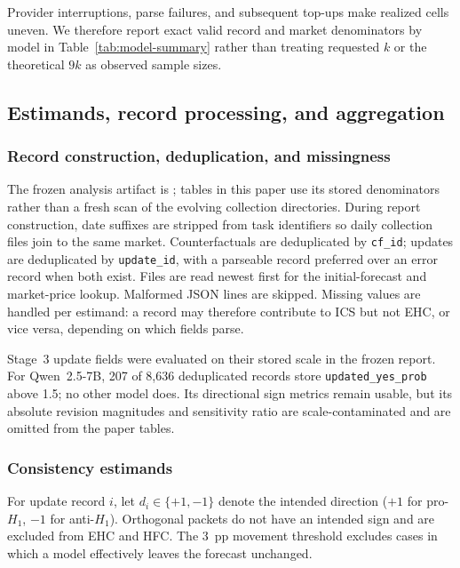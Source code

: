 Provider interruptions, parse failures, and subsequent top-ups make realized cells
uneven.  We therefore report exact valid record and market denominators by model in
Table~\ref{tab:model-summary} rather than treating requested \(k\) or the theoretical
\(9k\) as observed sample sizes.

\subsection{Estimands, record processing, and aggregation}
\label{app:metrics}

\subsubsection{Record construction, deduplication, and missingness}
\label{app:record-processing}

The frozen analysis artifact is
; tables in
this paper use its stored denominators rather than a fresh scan of the evolving
collection directories.  During report construction, date suffixes are stripped from
task identifiers so daily collection files join to the same market.  Counterfactuals
are deduplicated by \texttt{cf\_id}; updates are deduplicated by
\texttt{update\_id}, with a parseable record preferred over an error record when both
exist.  Files are read newest first for the initial-forecast and market-price lookup.
Malformed JSON lines are skipped.  Missing values are handled per estimand: a record
may therefore contribute to ICS but not EHC, or vice versa, depending on which fields
parse.

Stage~3 update fields were evaluated on their stored scale in the frozen report.
For Qwen~2.5-7B, 207 of 8,636 deduplicated records store
\texttt{updated\_yes\_prob} above 1.5; no other model does. Its directional sign
metrics remain usable, but its absolute revision magnitudes and sensitivity
ratio are scale-contaminated and are omitted from the paper tables.

\subsubsection{Consistency estimands}
\label{app:metric-definitions}

For update record \(i\), let \(d_i\in\{+1,-1\}\) denote the intended direction
(\(+1\) for pro-$H_1$, \(-1\) for anti-$H_1$).  Orthogonal packets do not have an
intended sign and are excluded from EHC and HFC.  The 3~pp movement threshold excludes
cases in which a model effectively leaves the forecast unchanged.

